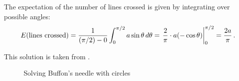 The expectation of the number of lines crossed is given by integrating over possible angles:
\begin{equation}\label{eq.buffon-integral}
E(\textrm{lines crossed}) =
  \displaystyle\frac{1}{(\pi/2)-0} \int_0^{\pi/2} a\sin \theta\,
  d\theta=\left.\displaystyle\frac{2}{\pi}\cdot a (-\cos \theta)
  \right|_0^{\pi/2}=\displaystyle\frac{2a}{\pi}\,.
\end{equation}

 This solution is taken from \cite[Chapter~26]{proofs}.

\begin{figure}[tb]
\begin{center}
\end{center}
\caption{Solving Buffon's needle with circles}\label{f.buffon3}
\end{figure}

